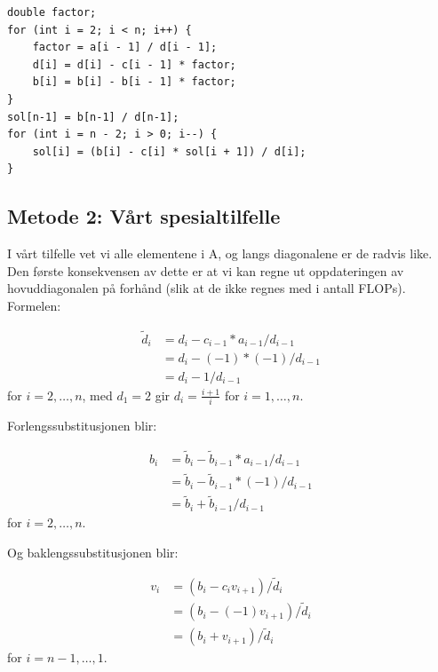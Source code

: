 \documentclass[reprint,english,notitlepage]{revtex4-1}
\begin{document}
	\begin{verbatim}
double factor;
for (int i = 2; i < n; i++) {
    factor = a[i - 1] / d[i - 1];
    d[i] = d[i] - c[i - 1] * factor;
    b[i] = b[i] - b[i - 1] * factor;
}
sol[n-1] = b[n-1] / d[n-1];
for (int i = n - 2; i > 0; i--) {
    sol[i] = (b[i] - c[i] * sol[i + 1]) / d[i];
}
	\end{verbatim}

\subsection{Metode 2: Vårt spesialtilfelle}

	I vårt tilfelle vet vi alle elementene i A, og langs diagonalene er de radvis like. Den første konsekvensen av dette er at vi kan regne ut oppdateringen av hovuddiagonalen på forhånd (slik at de ikke regnes med i antall FLOPs). Formelen:
	
	\begin{equation*}
	\begin{aligned}
	\tilde{d}_i &= d_i - c_{i-1} * a_{i-1}/d_{i-1} \\
	&= d_i - (-1) * (-1)/d_{i-1} \\
	&= d_i - 1/d_{i-1}
	\end{aligned}
	\end{equation*}
	for $i=2,\dots, n$, med $d_1 = 2$ gir $d_i = \frac{i + 1}{i}$ for $i=1,\dots, n$.
	
	Forlengssubstitusjonen blir:
	
	\begin{equation*}
	\begin{aligned}
	b_i &= \tilde{b}_i - \tilde{b}_{i-1} * a_{i-1}/d_{i-1} \\
	&= \tilde{b}_i - \tilde{b}_{i-1} * (-1)/d_{i-1} \\
	&= \tilde{b}_i + \tilde{b}_{i-1} /d_{i-1}
	\end{aligned}
	\end{equation*}
	for $i=2,\dots, n$.
	
	Og baklengssubstitusjonen blir:
	
	\begin{equation*}
	\begin{aligned}
	v_{i} &= (b_{i} - c_{i}v_{i+1}) / \tilde{d}_{i} \\
	&= (b_{i} - (-1)v_{i+1}) / \tilde{d}_{i} \\
	&= (b_{i} + v_{i+1}) / \tilde{d}_{i}
	\end{aligned}
	\end{equation*}
	for $i=n-1,\dots, 1$.
	
\end{document}
